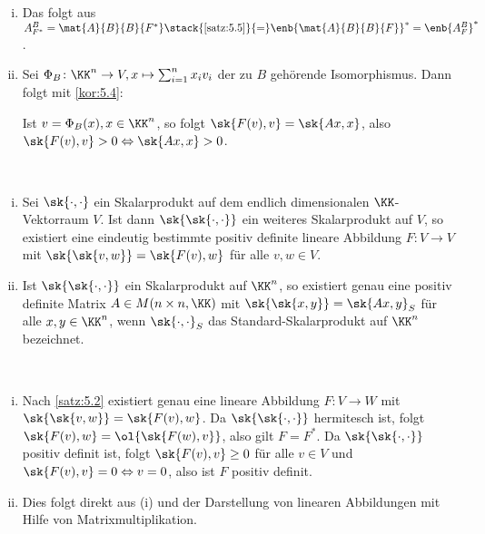 \begin{beweis}
	\mbox{} \\[-0.9cm]
	\begin{enumerate}[(i)]
		\item Das folgt aus $A^B_{F^*} = \mat{A}{B}{B}{F^*} \stack{\ref{satz:5.5}}{=} \enb{\mat{A}{B}{B}{F}}^* = \enb{A^B_F}^*$.
		\item Sei $\Phi_B\colon \KK^n \rightarrow V, x \mapsto \sum_{i=1}^{n} x_i v_i$ der zu $B$ gehörende Isomorphismus.
		Dann folgt mit \autoref{kor:5.4}:
		
		Ist $v = \Phi_B(x), x \in \KK^n$, so folgt $\sk{F(v),v} = \sk{Ax,x}$, also $\sk{F(v),v} > 0 \Leftrightarrow \sk{Ax,x} > 0$. 
	\end{enumerate}
\end{beweis}

\begin{korollar}
	\label{kor:5.10}
	\mbox{} \\[-1.4cm]
	\begin{enumerate}[(i)]
		\item Sei $\sk{\cdot,\cdot}$ ein Skalarprodukt auf dem endlich dimensionalen $\KK$-Vektorraum $V$.
		Ist dann $\sk{\sk{\cdot,\cdot}}$ ein weiteres Skalarprodukt auf $V$, so existiert eine eindeutig bestimmte positiv definite lineare Abbildung $F\colon V \rightarrow V$ mit $\sk{\sk{v,w}} = \sk{F(v),w}$ für alle $v,w \in V$.
		\item Ist $\sk{\sk{\cdot,\cdot}}$ ein Skalarprodukt auf $\KK^n$, so existiert genau eine positiv definite Matrix $A \in M(n \times n,\KK)$ mit $\sk{\sk{x,y}} = \sk{Ax,y}_S$ für alle $x,y \in \KK^n$, wenn $\sk{\cdot,\cdot}_S$ das Standard-Skalarprodukt auf $\KK^n$ bezeichnet.
	\end{enumerate}
\end{korollar}

\begin{beweis}
	\mbox{} \\[-.9cm]
	\begin{enumerate}[(i)]
		\item Nach \autoref{satz:5.2} existiert genau eine lineare Abbildung $F \colon V \rightarrow W$ mit $\sk{\sk{v,w}} = \sk{F(v),w}$.
		Da $\sk{\sk{\cdot,\cdot}}$ hermitesch ist, folgt $\sk{F(v),w} = \ol{\sk{F(w),v}}$, also gilt $F = F^*$.
		Da $\sk{\sk{\cdot,\cdot}}$ positiv definit ist, folgt $\sk{F(v),v} \geq 0$ für alle $v \in V$ und $\sk{F(v),v} = 0 \Leftrightarrow v = 0$, also ist $F$ positiv definit.
		\item Dies folgt direkt aus (i) und der Darstellung von linearen Abbildungen mit Hilfe von Matrixmultiplikation. 
	\end{enumerate}
\end{beweis}

